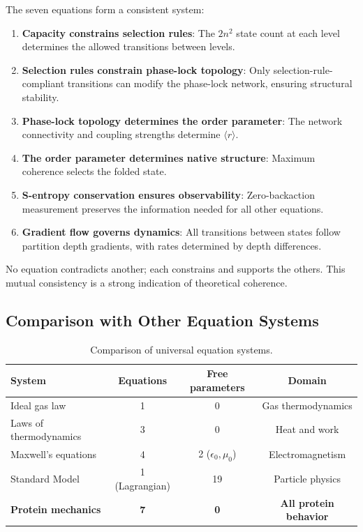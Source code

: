 \documentclass[aps,prx,superscriptaddress,twocolumn,10pt,a4paper,longbibliography,preprint]{revtex4-2}
\newcommand{\orderp}{\langle r \rangle}
\theoremstyle{definition}
\theoremstyle{remark}
\begin{document}
The seven equations form a consistent system:
\begin{enumerate}
\item \textbf{Capacity constrains selection rules}: The $2n^2$ state count at each level determines the allowed transitions between levels.
\item \textbf{Selection rules constrain phase-lock topology}: Only selection-rule-compliant transitions can modify the phase-lock network, ensuring structural stability.
\item \textbf{Phase-lock topology determines the order parameter}: The network connectivity and coupling strengths determine $\orderp$.
\item \textbf{The order parameter determines native structure}: Maximum coherence selects the folded state.
\item \textbf{S-entropy conservation ensures observability}: Zero-backaction measurement preserves the information needed for all other equations.
\item \textbf{Gradient flow governs dynamics}: All transitions between states follow partition depth gradients, with rates determined by depth differences.
\end{enumerate}

No equation contradicts another; each constrains and supports the others. This mutual consistency is a strong indication of theoretical coherence.

\subsection{Comparison with Other Equation Systems}

\begin{table}[h]
\centering
\caption{Comparison of universal equation systems.}
\label{tab:comparison}
\begin{tabular}{lccc}
\toprule
System & Equations & Free parameters & Domain \\
\midrule
Ideal gas law & 1 & 0 & Gas thermodynamics \\
Laws of thermodynamics & 3 & 0 & Heat and work \\
Maxwell's equations & 4 & 2 ($\epsilon_0, \mu_0$) & Electromagnetism \\
Standard Model & 1 (Lagrangian) & 19 & Particle physics \\
\textbf{Protein mechanics} & \textbf{7} & \textbf{0} & \textbf{All protein behavior} \\
\bottomrule
\end{tabular}
\end{table}
\end{document}
